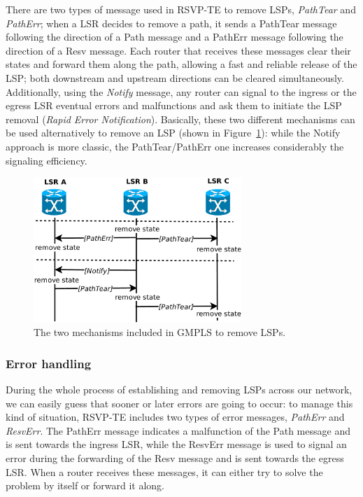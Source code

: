 \documentclass[10pt,a4paper]{report}
\begin{document}
There are two types of message used in RSVP-TE to remove LSPs,
\textit{PathTear} and \textit{PathErr}; when a LSR decides to remove a
path, it sends a PathTear message following the direction of a Path
message and a PathErr message following the direction of a Resv
message. Each router that receives these messages clear their states
and forward them along the path, allowing a fast and reliable release
of the LSP; both downstream and upstream directions can be cleared
simultaneously. Additionally, using the \textit{Notify} message, any
router can signal to the ingress or the egress LSR eventual errors and
malfunctions and ask them to initiate the LSP removal (\textit{Rapid
  Error Notification}). Basically, these two different mechanisms can
be used alternatively to remove an LSP (shown in
Figure~\ref{fig:rsvp_tear}): while the Notify approach is more
classic, the PathTear/PathErr one increases considerably the signaling
efficiency.

\begin{figure}[!htbp]
  \centering
  \includegraphics[width=0.7\textwidth]{img/rsvp_tear}
  \caption[RSVP-TE path removal]{The two mechanisms included in GMPLS
    to remove LSPs.}
  \label{fig:rsvp_tear}
\end{figure}

\subsubsection{Error handling}

During the whole process of establishing and removing LSPs across our
network, we can easily guess that sooner or later errors are going to
occur: to manage this kind of situation, RSVP-TE includes two types of
error messages, \textit{PathErr} and \textit{ResvErr}. The PathErr
message indicates a malfunction of the Path message and is sent
towards the ingress LSR, while the ResvErr message is used to signal
an error during the forwarding of the Resv message and is sent towards
the egress LSR\@. When a router receives these messages, it can either
try to solve the problem by itself or forward it along.
\end{document}
